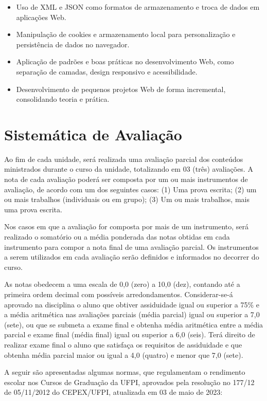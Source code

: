 \documentclass[a4paper, 12pt]{article}
\begin{document}
\begin{itemize}
\begin{itemize}
            \item Uso de XML e JSON como formatos de armazenamento e troca de dados em aplicações Web.
            \item Manipulação de cookies e armazenamento local para personalização e persistência de dados no navegador.
            \item Aplicação de padrões e boas práticas no desenvolvimento Web, como separação de camadas, design responsivo e acessibilidade.
            \item Desenvolvimento de pequenos projetos Web de forma incremental, consolidando teoria e prática.
        \end{itemize}
\end{itemize}

\section{Sistemática de Avaliação}

Ao fim de cada unidade, será realizada uma avaliação parcial dos conteúdos ministrados durante o curso da unidade, totalizando em 03 (três) avaliações. A nota de cada avaliação poderá ser composta por um ou mais instrumentos de avaliação, de acordo com um dos seguintes casos: (1) Uma prova escrita; (2) um ou mais trabalhos (individuais ou em grupo); (3) Um ou mais trabalhos, mais uma prova escrita.

Nos casos em que a avaliação for composta por mais de um instrumento, será realizado o somatório ou a média ponderada das notas obtidas em cada instrumento para compor a nota final de uma avaliação parcial. Os instrumentos a serem utilizados em cada avaliação serão definidos e informados no decorrer do curso.

As notas obedecem a uma escala de 0,0 (zero) a 10,0 (dez), contando até a primeira ordem decimal com possíveis arredondamentos. Considerar-se-á aprovado na disciplina o aluno que obtiver assiduidade igual ou superior a 75\% e a média aritmética nas avaliações parciais (média parcial) igual ou superior a 7,0 (sete), ou que se submeta a exame final e obtenha média aritmética entre a média parcial e exame final (média final) igual ou superior a 6,0 (seis). Terá direito de realizar exame final o aluno que satisfaça os requisitos de assiduidade e que obtenha média parcial maior ou igual a 4,0 (quatro) e menor que 7,0 (sete).

A seguir são apresentadas algumas normas, que regulamentam o rendimento escolar
nos Cursos de Graduação da UFPI, aprovados pela resolução no 177/12 de 05/11/2012 do CEPEX/UFPI, atualizada em 03 de maio de 2023:
\end{document}
